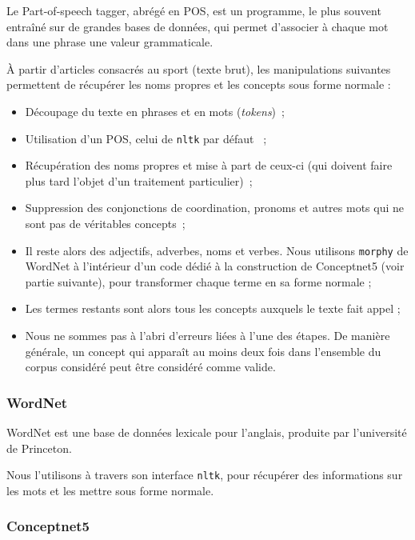 \documentclass[a4paper,12pt]{article}
\newcommand{\pyt}[1]{\texttt{#1}}
\begin{document}
\begin{definition}
Le Part-of-speech tagger, abr\'eg\'e en POS, est un programme, le plus souvent entra\^in\'e sur de grandes bases de donn\'ees, qui permet d'associer \`a chaque mot dans une phrase une valeur grammaticale.
\end{definition}

\`A partir d'articles consacr\'es au sport (texte brut), les manipulations suivantes permettent de r\'ecup\'erer les noms propres et les concepts sous forme normale :
\begin{itemize}
 \item Découpage du texte en phrases et en mots (\textit{tokens})~;
 \item Utilisation d'un POS, celui de \pyt{nltk} par d\'efaut ~;
 \item Récupération des noms propres et mise à part de ceux-ci (qui doivent faire plus tard l'objet d'un traitement particulier)~;
 \item Suppression des conjonctions de coordination, pronoms et autres mots qui ne sont pas de v\'eritables concepts~;
 \item Il reste alors des adjectifs, adverbes, noms et verbes. Nous utilisons \pyt{morphy} de WordNet \`a l'int\'erieur d'un code d\'edi\'e \`a la construction de Conceptnet5 (voir partie suivante), pour transformer chaque terme en sa forme normale ;
 \item Les termes restants sont alors tous les concepts auxquels le texte fait appel ;
 \item Nous ne sommes pas \`a l'abri d'erreurs li\'ees \`a l'une des \'etapes. De manière générale, un concept qui apparaît au moins deux fois dans l'ensemble du corpus considéré peut être considéré comme valide.
\end{itemize}


\subsubsection{WordNet}

WordNet est une base de donn\'ees lexicale pour l'anglais, produite par l'universit\'e de Princeton.

Nous l'utilisons à travers son interface \pyt{nltk}, pour récupérer des informations sur les mots et les mettre sous forme normale.


\subsubsection{Conceptnet5}
\end{document}
